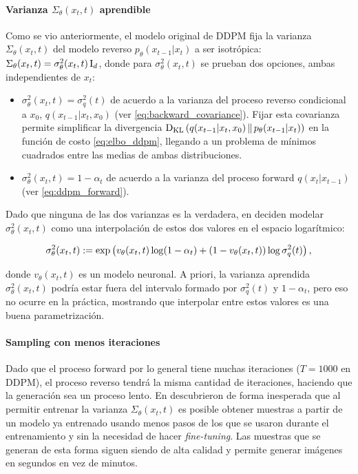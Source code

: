 \paragraph{Varianza \texorpdfstring{$\Sigma_\theta(x_t,t)$}{} aprendible}

Como se vio anteriormente, el modelo original de DDPM \cite{ho2020denoising} fija la varianza $\Sigma_\theta(x_t,t)$ del modelo reverso $p_\theta(x_{t-1}|x_{t})$ a ser isotrópica: $\Sigma_\theta(x_t,t) = \sigma^2_\theta(x_t,t) \operatorname{I}_{d}$, donde para $\sigma^2_\theta(x_t,t)$ se prueban dos opciones, ambas independientes de $x_t$:

\begin{itemize}
    \item $\sigma^2_\theta(x_t,t) = \sigma_q^2(t)$ de acuerdo a la varianza del proceso reverso condicional a $x_0$, $q(x_{t-1}|x_t,x_0)$ (ver \eqref{eq:backward_covariance}). Fijar esta covarianza permite simplificar la divergencia $\operatorname{D_{KL}}\left(q(x_{t-1}|x_t,x_0)\,\|\,p_\theta(x_{t-1}|x_t)\right)$ en la función de costo \eqref{eq:elbo_ddpm}, llegando a un problema de mínimos cuadrados entre las medias de ambas distribuciones.
    \item $\sigma^2_\theta(x_t,t) = 1-\alpha_t$ de acuerdo a la varianza del proceso forward $q(x_t|x_{t-1})$ (ver \eqref{eq:ddpm_forward}).
\end{itemize}

Dado que ninguna de las dos varianzas es la verdadera, en \cite{nichol2021improved} deciden modelar $\sigma^2_\theta(x_t,t)$ como una interpolación de estos dos valores en el espacio logarítmico:

\begin{equation*}
    \sigma^2_\theta(x_t,t):= \exp\left(v_\theta(x_t,t)\log (1-\alpha_t) + (1-v_\theta(x_t,t))\log \sigma^2_q(t)\right),
\end{equation*}

donde $v_\theta(x_t,t)$ es un modelo neuronal. A priori, la varianza aprendida $\sigma^2_\theta(x_t,t)$ podría estar fuera del intervalo formado por $\sigma_q^2(t)$ y $1-\alpha_t$, pero eso no ocurre en la práctica, mostrando que interpolar entre estos valores es una buena parametrización.

\paragraph{Sampling con menos iteraciones}

Dado que el proceso forward por lo general tiene muchas iteraciones ($T=1000$ en DDPM), el proceso reverso tendrá la misma cantidad de iteraciones, haciendo que la generación sea un proceso lento. En \cite{nichol2021improved} descubrieron de forma inesperada que al permitir entrenar la varianza $\Sigma_\theta(x_t,t)$ es posible obtener muestras a partir de un modelo ya entrenado usando menos pasos de los que se usaron durante el entrenamiento y sin la necesidad de hacer \textit{fine-tuning}. Las muestras que se generan de esta forma siguen siendo de alta calidad y permite generar imágenes en segundos en vez de minutos.


